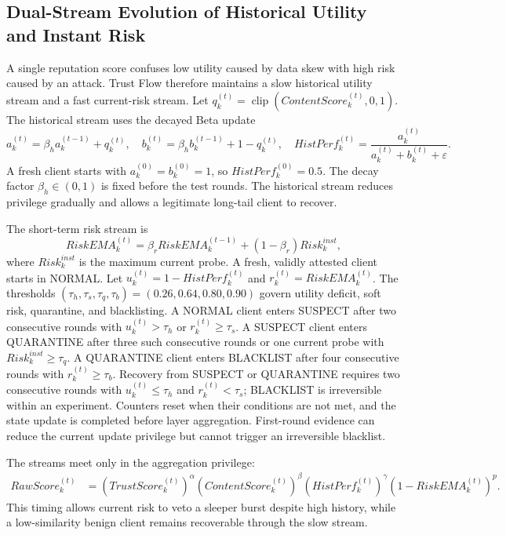\documentclass[final,5p,times,twocolumn]{elsarticle/elsarticle}
\begin{document}
\subsection{Dual-Stream Evolution of Historical Utility and Instant Risk}
A single reputation score confuses low utility caused by data skew with high
risk caused by an attack. Trust Flow therefore maintains a slow historical
utility stream and a fast current-risk stream. Let
$q_k^{(t)}=\operatorname{clip}(ContentScore_k^{(t)},0,1)$. The historical stream
uses the decayed Beta update
\begin{equation}
    a_k^{(t)}=\beta_h a_k^{(t-1)}+q_k^{(t)},\quad
    b_k^{(t)}=\beta_h b_k^{(t-1)}+1-q_k^{(t)},\quad
    HistPerf_k^{(t)}=\frac{a_k^{(t)}}{a_k^{(t)}+b_k^{(t)}+\varepsilon}.
\end{equation}
A fresh client starts with $a_k^{(0)}=b_k^{(0)}=1$, so
$HistPerf_k^{(0)}=0.5$. The decay factor $\beta_h\in(0,1)$ is fixed before the
test rounds. The historical stream reduces privilege gradually and allows a
legitimate long-tail client to recover.

The short-term risk stream is
\begin{equation}
    RiskEMA_k^{(t)}=\beta_rRiskEMA_k^{(t-1)}
    +(1-\beta_r)Risk_k^{inst},
\end{equation}
where $Risk_k^{inst}$ is the maximum current probe. A fresh, validly attested
client starts in NORMAL. Let
$u_k^{(t)}=1-HistPerf_k^{(t)}$ and
$r_k^{(t)}=RiskEMA_k^{(t)}$. The thresholds
$(\tau_h,\tau_s,\tau_q,\tau_b)=(0.26,0.64,0.80,0.90)$ govern utility deficit,
soft risk, quarantine, and blacklisting. A NORMAL client enters SUSPECT after
two consecutive rounds with $u_k^{(t)}>\tau_h$ or $r_k^{(t)}\geq\tau_s$. A
SUSPECT client enters QUARANTINE after three such consecutive rounds or one
current probe with $Risk_k^{inst}\geq\tau_q$. A QUARANTINE client enters
BLACKLIST after four consecutive rounds with $r_k^{(t)}\geq\tau_b$. Recovery
from SUSPECT or QUARANTINE requires two consecutive rounds with
$u_k^{(t)}\leq\tau_h$ and $r_k^{(t)}<\tau_s$; BLACKLIST is irreversible within
an experiment. Counters reset when their conditions are not met, and the state
update is completed before layer aggregation. First-round evidence can reduce
the current update privilege but cannot trigger an irreversible blacklist.

The streams meet only in the aggregation privilege:
\begin{align}
    RawScore_k^{(t)} &=(TrustScore_k^{(t)})^\alpha
    (ContentScore_k^{(t)})^\beta(HistPerf_k^{(t)})^\gamma
    (1-RiskEMA_k^{(t)})^p.
\end{align}
This timing allows current risk to veto a sleeper burst despite high history,
while a low-similarity benign client remains recoverable through the slow stream.
\end{document}
